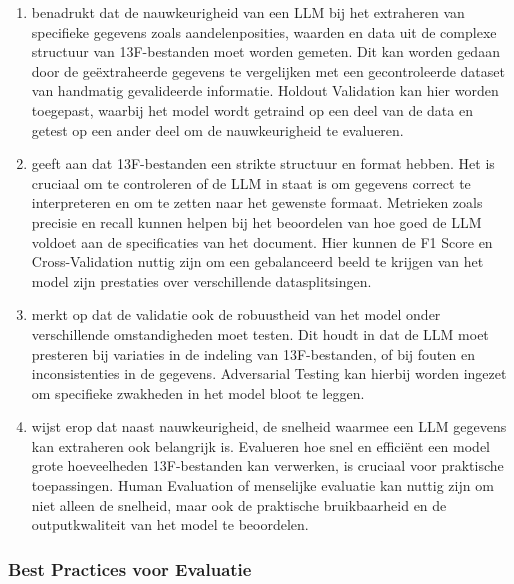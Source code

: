 \begin{enumerate}
    \item \textcite{Islam2024} benadrukt dat de nauwkeurigheid van een LLM bij het extraheren van specifieke gegevens zoals aandelenposities, waarden en data uit de complexe structuur van 13F-bestanden moet worden gemeten. Dit kan worden gedaan door de geëxtraheerde gegevens te vergelijken met een gecontroleerde dataset van handmatig gevalideerde informatie. Holdout Validation kan hier worden toegepast, waarbij het model wordt getraind op een deel van de data en getest op een ander deel om de nauwkeurigheid te evalueren.
    \item \textcite{Islam2024} geeft aan dat 13F-bestanden een strikte structuur en format hebben. Het is cruciaal om te controleren of de LLM in staat is om gegevens correct te interpreteren en om te zetten naar het gewenste formaat. Metrieken zoals precisie en recall kunnen helpen bij het beoordelen van hoe goed de LLM voldoet aan de specificaties van het document. Hier kunnen de F1 Score en Cross-Validation nuttig zijn om een gebalanceerd beeld te krijgen van het model zijn prestaties over verschillende datasplitsingen.
    \item \textcite{Islam2024} merkt op dat de validatie ook de robuustheid van het model onder verschillende omstandigheden moet testen. Dit houdt in dat de LLM moet presteren bij variaties in de indeling van 13F-bestanden, of bij fouten en inconsistenties in de gegevens. Adversarial Testing kan hierbij worden ingezet om specifieke zwakheden in het model bloot te leggen.
    \item \textcite{Islam2024} wijst erop dat naast nauwkeurigheid, de snelheid waarmee een LLM gegevens kan extraheren ook belangrijk is. Evalueren hoe snel en efficiënt een model grote hoeveelheden 13F-bestanden kan verwerken, is cruciaal voor praktische toepassingen. Human Evaluation of menselijke evaluatie kan nuttig zijn om niet alleen de snelheid, maar ook de praktische bruikbaarheid en de outputkwaliteit van het model te beoordelen.
\end{enumerate}

\subsubsection{Best Practices voor Evaluatie}

